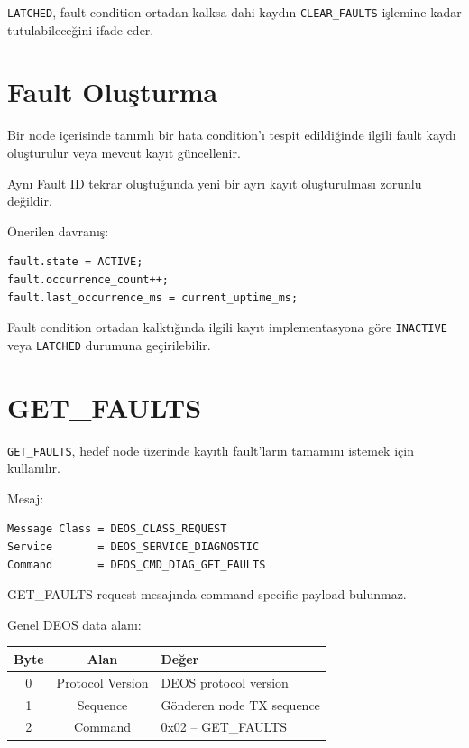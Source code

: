 \documentclass[a4paper,11pt]{article}
\begin{document}
\texttt{LATCHED}, fault condition ortadan kalksa dahi kaydın
\texttt{CLEAR\_FAULTS} işlemine kadar tutulabileceğini ifade eder.

\section{Fault Oluşturma}

Bir node içerisinde tanımlı bir hata condition'ı tespit edildiğinde
ilgili fault kaydı oluşturulur veya mevcut kayıt güncellenir.

Aynı Fault ID tekrar oluştuğunda yeni bir ayrı kayıt oluşturulması
zorunlu değildir.

Önerilen davranış:

\begin{lstlisting}
fault.state = ACTIVE;
fault.occurrence_count++;
fault.last_occurrence_ms = current_uptime_ms;
\end{lstlisting}

Fault condition ortadan kalktığında ilgili kayıt implementasyona göre
\texttt{INACTIVE} veya \texttt{LATCHED} durumuna geçirilebilir.

\section{GET\_FAULTS}

\texttt{GET\_FAULTS}, hedef node üzerinde kayıtlı fault'ların tamamını
istemek için kullanılır.

Mesaj:

\begin{lstlisting}
Message Class = DEOS_CLASS_REQUEST
Service       = DEOS_SERVICE_DIAGNOSTIC
Command       = DEOS_CMD_DIAG_GET_FAULTS
\end{lstlisting}

GET\_FAULTS request mesajında command-specific payload bulunmaz.

Genel DEOS data alanı:

\begin{center}
\begin{tabular}{c c l}
\toprule
\textbf{Byte} & \textbf{Alan} & \textbf{Değer} \\
\midrule
0 & Protocol Version & DEOS protocol version \\
1 & Sequence         & Gönderen node TX sequence \\
2 & Command          & 0x02 -- GET\_FAULTS \\
\bottomrule
\end{tabular}
\end{center}
\end{document}
